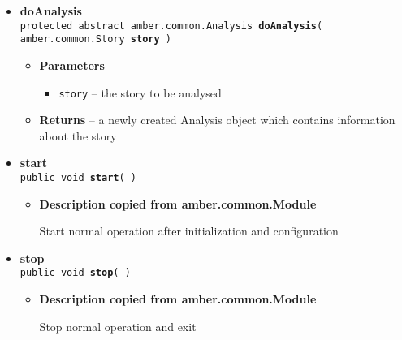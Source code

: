 {{{\begin{itemize}
{\begin{itemize}
{When a message comes in, this method is called on the set implementer of this interface.
}
\item{
{\bf Parameters}
  \begin{itemize}
   \item{
{\tt msg} -- }
  \end{itemize}
}%
\item{{\bf Returns} -- 
true if the message was handled, false if it wasn't 
}%
\end{itemize}
}%
 \item{ 
{\bf doAnalysis}\\
{\tt protected abstract amber.common.Analysis\ {\bf doAnalysis}( {\tt amber.common.Story} {\bf story} )
\label{amber.sieve.KeywordSpotter.doAnalysis(amber.common.Story)}}%
\begin{itemize}
\item{
{\bf Parameters}
  \begin{itemize}
   \item{
{\tt story} -- the story to be analysed}
  \end{itemize}
}%
\item{{\bf Returns} -- 
a newly created Analysis object which contains information about the story 
}%
\end{itemize}
}%
 \item{ 
{\bf start}\\
{\tt public void\ {\bf start}(  )
\label{amber.sieve.KeywordSpotter.start()}}%
\begin{itemize}
\item{
{\bf Description copied from amber.common.Module{\small {}} }

Start normal operation after initialization and configuration
}
\end{itemize}
}%
 \item{ 
{\bf stop}\\
{\tt public void\ {\bf stop}(  )
\label{amber.sieve.KeywordSpotter.stop()}}%
\begin{itemize}
\item{
{\bf Description copied from amber.common.Module{\small {}} }

Stop normal operation and exit
}
\end{itemize}
}%
\end{itemize}
}
}
}
